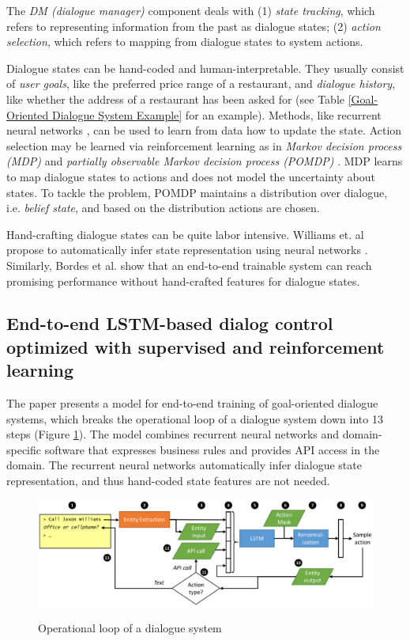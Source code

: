 \documentclass[paper=a4, fontsize=18pt]{article} %
\numberwithin{equation}{section} %
\numberwithin{figure}{section} %
\numberwithin{table}{section} %
\begin{document}
The \emph{DM (dialogue manager)} component deals with (1) \emph{state tracking}, which refers to representing information from the past as dialogue states; (2) \emph{action selection}, which refers to mapping from dialogue states to system actions.

Dialogue states can be hand-coded and human-interpretable. They usually consist of \emph{user goals}, like the preferred price range of a restaurant, and \emph{dialogue history}, like whether the address of a restaurant has been asked for (see Table \ref{Goal-Oriented Dialogue System Example} for an example). Methods, like recurrent neural networks \cite{Henderson2014Word}, can be used to learn from data how to update the state. Action selection may be learned via reinforcement learning as in \emph{Markov decision process (MDP)} \cite{Levin2000A} and \emph{partially observable Markov decision process (POMDP)} \cite{Young2013Pomdp, Gasic2011}. MDP learns to map dialogue states to actions and does not model the uncertainty about states. To tackle the problem, POMDP maintains a distribution over dialogue, i.e. \emph{belief state}, and based on the distribution actions are chosen.

Hand-crafting dialogue states can be quite labor intensive. Williams et. al propose to automatically infer state representation using neural networks \cite{Williams2016End}. Similarly, Bordes et al. show that an end-to-end trainable system can reach promising performance without hand-crafted features for dialogue states.

\subsection{End-to-end LSTM-based dialog control optimized with supervised and reinforcement learning \cite{Williams2016End}}

The paper presents a model for end-to-end training of goal-oriented dialogue systems, which breaks the operational loop of a dialogue system down into 13 steps (Figure \ref{fig:Williams2016End01}). The model combines recurrent neural networks and domain-specific software that expresses business rules and provides API access in the domain. The recurrent neural networks automatically infer dialogue state representation, and thus hand-coded state features are not needed.

\begin{figure}[htbp]
  \centering
  \includegraphics[width=\linewidth]{Williams2016End01}\\
  \caption{Operational loop of a dialogue system}\label{fig:Williams2016End01}
\end{figure}
\end{document}

